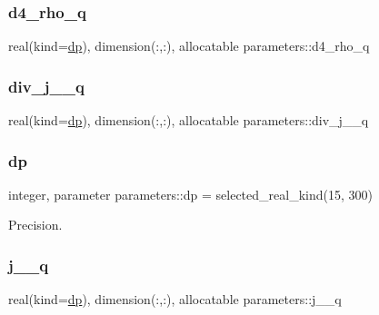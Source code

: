 \subsubsection{\texorpdfstring{d4\+\_\+rho\+\_\+q}{d4\_rho\_q}}
{\footnotesize\ttfamily real(kind=\mbox{\hyperlink{namespaceparameters_a52f8c6351fd79345d8811e065bcbbb37}{dp}}), dimension(\+:,\+:), allocatable parameters\+::d4\+\_\+rho\+\_\+q}

\mbox{\label{namespaceparameters_ab8757a22096c3d5f05f0bf953b59dff4}} 
\subsubsection{\texorpdfstring{div\+\_\+j\+\_\+\_\+q}{div\_j\_4\_q}}
{\footnotesize\ttfamily real(kind=\mbox{\hyperlink{namespaceparameters_a52f8c6351fd79345d8811e065bcbbb37}{dp}}), dimension(\+:,\+:), allocatable parameters\+::div\+\_\+j\+\_\+\_\+q}

\mbox{\label{namespaceparameters_a52f8c6351fd79345d8811e065bcbbb37}} 
\subsubsection{\texorpdfstring{dp}{dp}}
{\footnotesize\ttfamily integer, parameter parameters\+::dp = selected\+\_\+real\+\_\+kind(15, 300)}



Precision. 

\mbox{\label{namespaceparameters_a41689cc1fc405b2fd02236c39ee5528c}} 
\subsubsection{\texorpdfstring{j\+\_\+\_\+q}{j\_4\_q}}
{\footnotesize\ttfamily real(kind=\mbox{\hyperlink{namespaceparameters_a52f8c6351fd79345d8811e065bcbbb37}{dp}}), dimension(\+:,\+:), allocatable parameters\+::j\+\_\+\_\+q}

\mbox{\label{namespaceparameters_a1dd9d0c60fab7b85157b61471151ed92}} 
